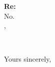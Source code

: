 \documentclass[12pt]{letter}
\date{\sendingDate}
\begin{document}
\begin{letter}{\recipientName \\
\recipientAddrLineOne \\
\recipientAddrLineTwo}

\opening{\textbf{Re: \matterTitle} \\
No. \recipientCaseNumber \\[2em]
\recipientSalutation,}

 \\[2em]         %

\closing{Yours sincerely,}\\[2em]

\end{letter}
\end{document}
